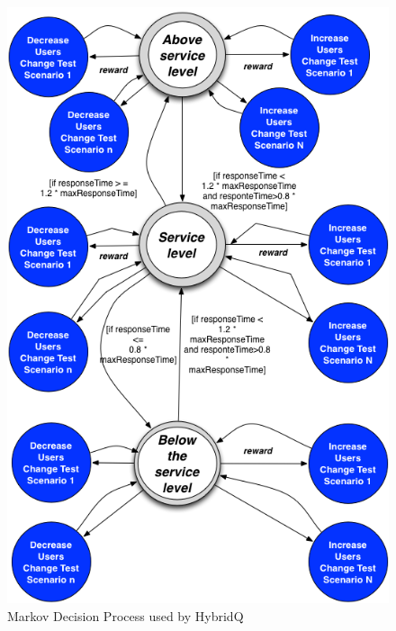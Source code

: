 \documentclass{bmcart}
\begin{document}
\begin{backmatter}
\begin{figure}[h!]
\begin{minipage}{.5\textwidth}
\center
\includegraphics{./images/mdp3.png}
\caption{Markov Decision Process used by HybridQ}
\label{fig:mdphybridq}
\end{minipage}
\begin{minipage}{.5\textwidth}
\center

\end{minipage}
\end{figure}
\end{backmatter}
\end{document}
